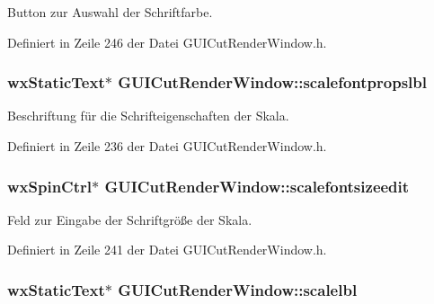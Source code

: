 Button zur Auswahl der Schriftfarbe. 



Definiert in Zeile 246 der Datei G\-U\-I\-Cut\-Render\-Window.\-h.

\hypertarget{classGUICutRenderWindow_a1f46a30a61ad94b76a6194758bdb3f95}{
\subsubsection[{scalefontpropslbl}]{\setlength{\rightskip}{0pt plus 5cm}wx\-Static\-Text$\ast$ G\-U\-I\-Cut\-Render\-Window\-::scalefontpropslbl\hspace{0.3cm}{\ttfamily [private]}}}\label{classGUICutRenderWindow_a1f46a30a61ad94b76a6194758bdb3f95}


Beschriftung für die Schrifteigenschaften der Skala. 



Definiert in Zeile 236 der Datei G\-U\-I\-Cut\-Render\-Window.\-h.

\hypertarget{classGUICutRenderWindow_a62cb232f5f9747c1fdbc5c1f6ff4b7a4}{
\subsubsection[{scalefontsizeedit}]{\setlength{\rightskip}{0pt plus 5cm}wx\-Spin\-Ctrl$\ast$ G\-U\-I\-Cut\-Render\-Window\-::scalefontsizeedit\hspace{0.3cm}{\ttfamily [private]}}}\label{classGUICutRenderWindow_a62cb232f5f9747c1fdbc5c1f6ff4b7a4}


Feld zur Eingabe der Schriftgröße der Skala. 



Definiert in Zeile 241 der Datei G\-U\-I\-Cut\-Render\-Window.\-h.

\hypertarget{classGUICutRenderWindow_a3c1e80a372d6eaacd4f6ca71a788c9fd}{
\subsubsection[{scalelbl}]{\setlength{\rightskip}{0pt plus 5cm}wx\-Static\-Text$\ast$ G\-U\-I\-Cut\-Render\-Window\-::scalelbl\hspace{0.3cm}{\ttfamily [private]}}}\label{classGUICutRenderWindow_a3c1e80a372d6eaacd4f6ca71a788c9fd}


